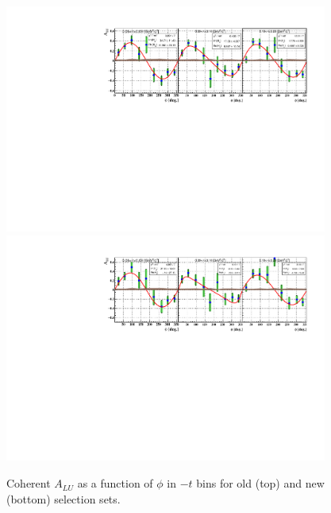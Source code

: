 \begin{figure}[h!]
\centering
\includegraphics[height=7.5cm]{old_plots/f_coh_alu_t_phi.pdf}
\includegraphics[height=7.5cm]{new_plots/Coh_ALU_t_phi.pdf}
\caption{Coherent $A_{LU}$ as a function of $\phi$ in $-t$ bins for old (top) 
and new (bottom) selection sets.}
\label{fig:ALU_t_phi}
\end{figure}


